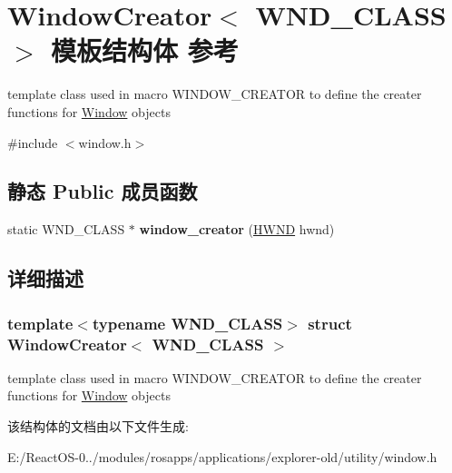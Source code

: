 \hypertarget{struct_window_creator}{}\section{Window\+Creator$<$ W\+N\+D\+\_\+\+C\+L\+A\+SS $>$ 模板结构体 参考}
\label{struct_window_creator}


template class used in macro W\+I\+N\+D\+O\+W\+\_\+\+C\+R\+E\+A\+T\+OR to define the creater functions for \hyperlink{struct_window}{Window} objects  




{\ttfamily \#include $<$window.\+h$>$}

\subsection*{静态 Public 成员函数}
\begin{DoxyCompactItemize}
\item 
\mbox{\label{struct_window_creator_ac5a220e2870c2442f6b92dc9f8110172}} 
static W\+N\+D\+\_\+\+C\+L\+A\+SS $\ast$ {\bfseries window\+\_\+creator} (\hyperlink{interfacevoid}{H\+W\+ND} hwnd)
\end{DoxyCompactItemize}


\subsection{详细描述}
\subsubsection*{template$<$typename W\+N\+D\+\_\+\+C\+L\+A\+SS$>$\newline
struct Window\+Creator$<$ W\+N\+D\+\_\+\+C\+L\+A\+S\+S $>$}

template class used in macro W\+I\+N\+D\+O\+W\+\_\+\+C\+R\+E\+A\+T\+OR to define the creater functions for \hyperlink{struct_window}{Window} objects 

该结构体的文档由以下文件生成\+:\begin{DoxyCompactItemize}
\item 
E\+:/\+React\+O\+S-\/0../modules/rosapps/applications/explorer-\/old/utility/window.\+h\end{DoxyCompactItemize}
